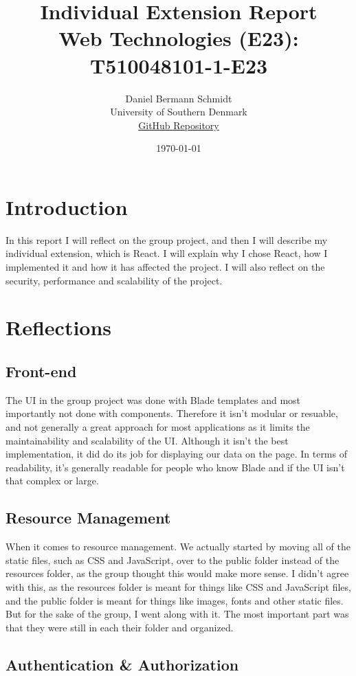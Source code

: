 \documentclass[letterpaper,twocolumn]{article}
\title{Individual Extension Report\\Web Technologies (E23): T510048101-1-E23}
\author{Daniel Bermann Schmidt\\University of Southern Denmark\\\href{https://github.com/Kururururururururu/MovielibLaravel/tree/Daniel_individuel_part}{GitHub Repository}}
\date{\today}
\begin{document}
\maketitle

\section{Introduction}
In this report I will reflect on the group project, and then I will describe my individual extension, which is React.
I will explain why I chose React, how I implemented it and how it has affected the project.
I will also reflect on the security, performance and scalability of the project.

\section{Reflections}
\subsection{Front-end}

The UI in the group project was done with Blade templates and most importantly not done with components.
Therefore it isn't modular or resuable, and not generally a great approach for most applications as it limits the maintainability and scalability of the UI.
Although it isn't the best implementation, it did do its job for displaying our data on the page.
In terms of readability, it's generally readable for people who know Blade and if the UI isn't that complex or large.

\subsection{Resource Management}
When it comes to resource management.
We actually started by moving all of the static files, such as CSS and JavaScript, over to the public folder instead of the resources folder, as the group thought this would make more sense.
I didn't agree with this, as the resources folder is meant for things like CSS and JavaScript files, and the public folder is meant for things like images, fonts and other static files.
But for the sake of the group, I went along with it. The most important part was that they were still in each their folder and organized.

\subsection{Authentication \& Authorization}
\end{document}
